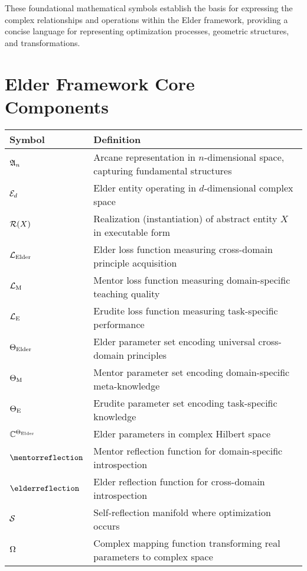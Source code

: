 \vspace{1cm}
\begin{center}
These foundational mathematical symbols establish the basis for expressing the complex relationships and operations within the Elder framework, providing a concise language for representing optimization processes, geometric structures, and transformations.
\end{center}

\clearpage
\chapter*{Elder Framework Core Components}

\begin{center}
\begin{tabular}{>{\centering\arraybackslash}p{3cm} p{10cm}}
\hline
\textbf{Symbol} & \textbf{Definition} \\
\hline
$\mathfrak{A}_{n}$ & Arcane representation in $n$-dimensional space, capturing fundamental structures \\
$\mathcal{E}_{d}$ & Elder entity operating in $d$-dimensional complex space \\
$\mathcal{R}(X)$ & Realization (instantiation) of abstract entity $X$ in executable form \\
$\mathcal{L}_{\text{Elder}}$ & Elder loss function measuring cross-domain principle acquisition \\
$\mathcal{L}_{\text{M}}$ & Mentor loss function measuring domain-specific teaching quality \\
$\mathcal{L}_{\text{E}}$ & Erudite loss function measuring task-specific performance \\
$\Theta_{\text{Elder}}$ & Elder parameter set encoding universal cross-domain principles \\
$\Theta_{\text{M}}$ & Mentor parameter set encoding domain-specific meta-knowledge \\
$\Theta_{\text{E}}$ & Erudite parameter set encoding task-specific knowledge \\
$\mathbb{C}^{\Theta_{\text{Elder}}}$ & Elder parameters in complex Hilbert space \\
$\mentorreflection$ & Mentor reflection function for domain-specific introspection \\
$\elderreflection$ & Elder reflection function for cross-domain introspection \\
$\mathcal{S}$ & Self-reflection manifold where optimization occurs \\
$\Omega$ & Complex mapping function transforming real parameters to complex space \\
\hline
\end{tabular}
\end{center}

